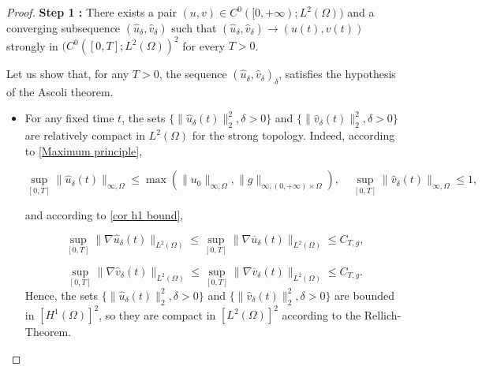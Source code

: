 \documentclass[reqno,12pt,twoside]{amsart}
\numberwithin{equation}{section} \numberwithin{theorem}{section}
\numberwithin{proposition}{section} \numberwithin{lemma}{section}
\numberwithin{corollary}{section}
\numberwithin{definition}{section} \numberwithin{remark}{section}
\begin{document}
\begin{proof}
\textbf{Step 1 :} There exists a pair $(u,v) \in C^0([0,+\infty);L^2(\Omega))$ and a converging subsequence  $(\hat{u}_\delta, \hat{v}_\delta)$ such that $(\hat{u}_\delta, \hat{v}_\delta) \rightarrow (u(t) , v(t))$ strongly in $(C^0([0,T];L^2(\Omega))^2$ for every $T >0$.  

\smallskip

Let us show that, for any $T >0$, the sequence $(\hat{u}_\delta, \hat{v}_\delta)_\delta$, satisfies the hypothesis of the Ascoli theorem. 

\smallskip

\begin{itemize}
\item[$\bullet$] For any fixed time $t$, the sets $\{\|\hat{u}_\delta (t)\|_2^2, \delta >0\}$ and $\{\|\hat{v}_\delta (t)\|_2^2, \delta >0\}$ are relatively compact in $L^2(\Omega)$ for the strong topology. Indeed, according to \autoref{Maximum principle},

\[\sup_{[0,T]} \|\hat{u}_\delta(t)\|_{\infty , \Omega}\leqslant \max (\|u_0\|_{\infty, \Omega} , \|g\|_{\infty, (0,+\infty)\times \Omega}), \quad \sup_{[0,T]} \|\hat{v}_\delta(t)\|_{\infty , \Omega} \leqslant 1,\]

and according to \autoref{cor h1 bound}, 

\begin{equation}\label{compacitestar}
\sup_{[0,T]} \|\nabla \hat{u}_\delta(t)\|_{L^2(\Omega)} \leqslant \sup_{[0,T]} \|\nabla \overline{u}_\delta(t)\|_{L^2(\Omega)} \leqslant C_{T,g},
\end{equation}

\[\sup_{[0,T]} \|\nabla \hat{v}_\delta(t)\|_{L^2(\Omega)} \leqslant \sup_{[0,T]} \|\nabla \overline{v}_\delta(t)\|_{L^2(\Omega)} \leqslant C_{T,g}.\]
Hence, the sets $\{\|\hat{u}_\delta (t)\|_2^2, \delta >0\}$ and $\{\|\hat{v}_\delta (t)\|_2^2, \delta >0\}$ are bounded in $[H^1(\Omega)]^2$, so they are compact in $[L^2(\Omega)]^2$ according to the Rellich-Theorem. %

\smallskip


\end{itemize}
\end{proof}
\end{document}
